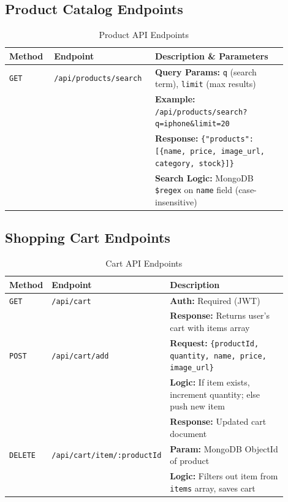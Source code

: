 \documentclass[12pt, a4paper]{report}
\begin{document}
\subsection{Product Catalog Endpoints}

\begin{table}[H]
\centering
\caption{Product API Endpoints}
\label{tab:api_products}
\small
\begin{tabular}{@{}p{0.15\linewidth}p{0.30\linewidth}p{0.45\linewidth}@{}}
\toprule
\textbf{Method} & \textbf{Endpoint} & \textbf{Description \& Parameters} \\
\midrule
\texttt{GET} & \texttt{/api/products/search} & 
\textbf{Query Params:} \texttt{q} (search term), \texttt{limit} (max results) \\
& & \textbf{Example:} \texttt{/api/products/search?q=iphone\&limit=20} \\
& & \textbf{Response:} \texttt{\{"products": [\{name, price, image\_url, category, stock\}]\}} \\
& & \textbf{Search Logic:} MongoDB \texttt{\$regex} on \texttt{name} field (case-insensitive) \\
\bottomrule
\end{tabular}
\end{table}

\subsection{Shopping Cart Endpoints}

\begin{table}[H]
\centering
\caption{Cart API Endpoints}
\label{tab:api_cart}
\small
\begin{tabular}{@{}p{0.15\linewidth}p{0.30\linewidth}p{0.45\linewidth}@{}}
\toprule
\textbf{Method} & \textbf{Endpoint} & \textbf{Description} \\
\midrule
\texttt{GET} & \texttt{/api/cart} & 
\textbf{Auth:} Required (JWT) \\
& & \textbf{Response:} Returns user's cart with items array \\
\midrule
\texttt{POST} & \texttt{/api/cart/add} & 
\textbf{Request:} \texttt{\{productId, quantity, name, price, image\_url\}} \\
& & \textbf{Logic:} If item exists, increment quantity; else push new item \\
& & \textbf{Response:} Updated cart document \\
\midrule
\texttt{DELETE} & \texttt{/api/cart/item/:productId} & 
\textbf{Param:} MongoDB ObjectId of product \\
& & \textbf{Logic:} Filters out item from \texttt{items} array, saves cart \\
\bottomrule
\end{tabular}
\end{table}
\end{document}

